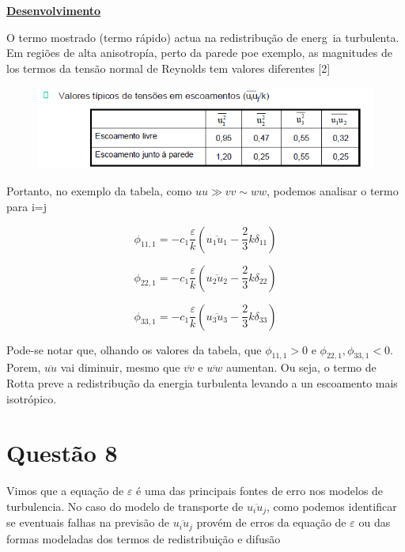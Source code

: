\documentclass[12pt]{article}
\begin{document}
\textbf{\underline{Desenvolvimento}}

O termo mostrado (termo rápido) actua na redistribução de energ~ia turbulenta. Em regiões de alta anisotropía, perto da parede poe exemplo, as magnitudes de los termos da tensão normal de Reynolds tem valores diferentes [2]


\begin{figure}[H]
	\centering
	\includegraphics[width=.65\textwidth]{figures/3}
\end{figure}

Portanto, no exemplo da tabela, como $uu\gg vv \sim ww$, podemos analisar o termo para i=j


\begin{equation}
	\phi_{11,1} = - c_1 \frac{\varepsilon}{k} \left( \overline{u_1 u_1} - \frac{2}{3} k \delta_{11} \right)
\end{equation}


\begin{equation}
	\phi_{22,1} = - c_1 \frac{\varepsilon}{k} \left( \overline{u_2 u_2} - \frac{2}{3} k \delta_{22} \right)
\end{equation}

\begin{equation}
	\phi_{33,1} = - c_1 \frac{\varepsilon}{k} \left( \overline{u_3 u_3} - \frac{2}{3} k \delta_{33} \right)
\end{equation}

Pode-se notar que, olhando os valores da tabela, que $\phi_{11,1} > 0$ e $\phi_{22,1}, \phi_{33,1}  < 0$. Porem, $\overline{uu}$ vai diminuir, mesmo que $\overline{vv}$ e $\overline{ww}$ aumentan. Ou seja, o termo de Rotta preve a redistribução da energia turbulenta levando a un escoamento mais isotrópico.

\section*{Questão 8}

Vimos que a equação de $\varepsilon$ é uma das principais fontes de erro nos modelos de turbulencia. No caso do modelo de transporte de $\overline{u_i u_j}$, como podemos identificar se eventuais falhas na previsão de $\overline{u_i u_j}$ provém de erros da equação de $\varepsilon$ ou das formas modeladas dos termos de redistribuição e difusão\\
\end{document}
